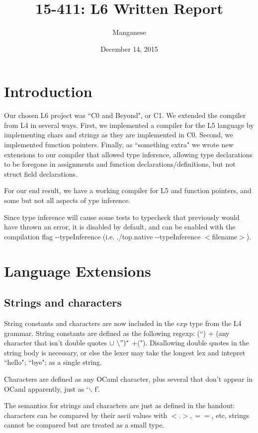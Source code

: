 \documentclass{article}
\title{15-411: L6 Written Report}
\author{Manganese}
\date{December 14, 2015}
\begin{document}
\maketitle

\section{Introduction}

Our chosen L6 project was ``C0 and Beyond", or C1. We extended the compiler from L4 in several ways. First, we implemented a compiler for the L5 language by implementing chars and strings as they are implemented in C0. Second, we implemented function pointers. Finally, as ``something extra" we wrote new extensions to our compiler that allowed type inference, allowing type declarations to be foregone in assignments and function declarations/definitions, but not struct field declarations.

For our end result, we have a working compiler for L5 and function pointers, and some but not all aspects of ype inference.


Since type inference will cause some tests to typecheck that previously would have thrown an error, it is disabled by default, and can be enabled with the compilation flag -{}-typeInference (i.e. ./top.native  -{}-typeInference $<$filename$>$).
\section{Language Extensions}


\subsection{Strings and characters}
String constants and characters are now included in the $exp$ type from the L4 grammar. String constants are defined as the following regexp: (``) + (any character that isn't double quotes $\cup \  \backslash")^*$ +("). Disallowing double quotes in the string body is necessary, or else the lexer may take the longest lex and intepret ``hello"; ``bye"; as a single string.

Characters are defined as any OCaml character, plus several that don't appear in OCaml apparently, just as `$\backslash$ f'.

The semantics for strings and characters are just as defined in the handout: characters can be compared by their ascii values with $<. >, ==$, etc, strings cannot be compared but are treated as a small type.
\end{document}
